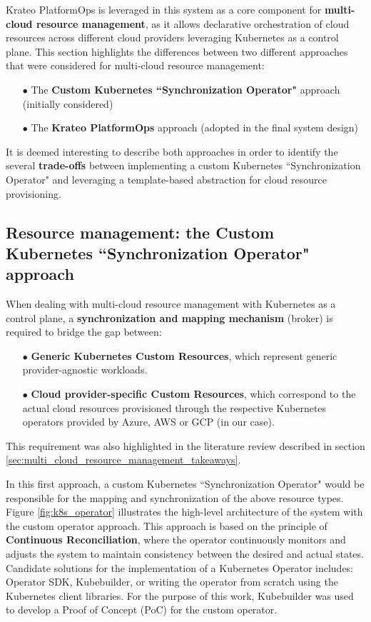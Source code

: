 Krateo PlatformOps is leveraged in this system as a core component for \textbf{multi-cloud resource management}, as it allows declarative orchestration of cloud resources across different cloud providers leveraging Kubernetes as a control plane. 
This section highlights the differences between two different approaches that were considered for multi-cloud resource management:
\begin{itemize}[itemsep=0.2pt, topsep=1pt]
  \item[$\bullet$] The \textbf{Custom Kubernetes ``Synchronization Operator"} approach (initially considered)
  \item[$\bullet$] The \textbf{Krateo PlatformOps} approach (adopted in the final system design) \\
\end{itemize}

It is deemed interesting to describe both approaches in order to identify the several \textbf{trade-offs} between implementing a custom Kubernetes ``Synchronization Operator" and leveraging a template-based abstraction for cloud resource provisioning.

\subsection{Resource management: the Custom Kubernetes ``Synchronization Operator" approach}

When dealing with multi-cloud resource management with Kubernetes as a control plane, a \textbf{synchronization and mapping mechanism} (broker) is required to bridge the gap between:
\begin{itemize}[itemsep=0.2pt, topsep=1pt]
  \item[$\bullet$] \textbf{Generic Kubernetes Custom Resources}, which represent generic provider-agnostic workloads.
  \item[$\bullet$] \textbf{Cloud provider-specific Custom Resources}, which correspond to the actual cloud resources provisioned through the respective Kubernetes operators provided by Azure, AWS or GCP (in our case).
\end{itemize}
This requirement was also highlighted in the literature review described in section \ref{sec:multi_cloud_resource_management_takeaways}.

In this first approach, a custom Kubernetes ``Synchronization Operator" would be responsible for the mapping and synchronization of the above resource types. 
Figure \ref{fig:k8s_operator} illustrates the high-level architecture of the system with the custom operator approach.
This approach is based on the principle of \textbf{Continuous Reconciliation}, where the operator continuously monitors and adjusts the system to maintain consistency between the desired and actual states.
Candidate solutions for the implementation of a Kubernetes Operator includes: Operator SDK, Kubebuilder, or writing the operator from scratch using the Kubernetes client libraries. 
For the purpose of this work, Kubebuilder was used to develop a Proof of Concept (PoC) for the custom operator.

